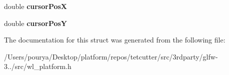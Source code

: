 \begin{DoxyCompactItemize}
\item 
\hypertarget{struct__GLFWwindowWayland_a4fa337c9768c3bd451db24603d548069}{}double {\bfseries cursor\+Pos\+X}\label{struct__GLFWwindowWayland_a4fa337c9768c3bd451db24603d548069}

\item 
\hypertarget{struct__GLFWwindowWayland_ac8a5b3ad373c2fd3c6ec4b171dab5af4}{}double {\bfseries cursor\+Pos\+Y}\label{struct__GLFWwindowWayland_ac8a5b3ad373c2fd3c6ec4b171dab5af4}

\end{DoxyCompactItemize}


The documentation for this struct was generated from the following file\+:\begin{DoxyCompactItemize}
\item 
/\+Users/pourya/\+Desktop/platform/repos/tetcutter/src/3rdparty/glfw-\/3../src/wl\+\_\+platform.\+h\end{DoxyCompactItemize}
